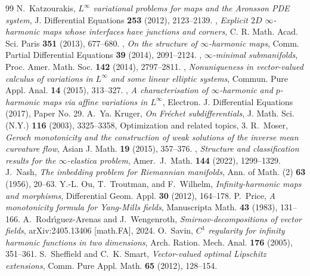 \documentclass[10pt,a4paper]{amsart}
\begin{document}
\begin{thebibliography}{99}
 N.~Katzourakis, \emph{{$L^\infty$} variational problems for maps and the {A}ronsson {PDE} system}, J. Differential Equations \textbf{253} (2012), 2123--2139.
 \bysame, \emph{Explicit {$2D$} {$\infty$}-harmonic maps whose interfaces have junctions and corners}, C. R. Math. Acad. Sci. Paris \textbf{351} (2013), 677--680.
 \bysame, \emph{On the structure of {$\infty$}-harmonic maps}, Comm. Partial Differential Equations \textbf{39} (2014), 2091--2124.
 \bysame, \emph{{$\infty$}-minimal submanifolds}, Proc. Amer. Math. Soc. \textbf{142} (2014), 2797--2811.
 \bysame, \emph{Nonuniqueness in vector-valued calculus of variations in {$L^\infty$} and some linear elliptic systems}, Commun. Pure Appl. Anal. \textbf{14} (2015), 313--327.
 \bysame, \emph{A characterisation of {$\infty$}-harmonic and {$p$}-harmonic maps via affine variations in {$L^\infty$}}, Electron. J. Differential Equations (2017), Paper No. 29.
 A.~Ya. Kruger, \emph{On {F}r\'echet subdifferentials}, J. Math. Sci. (N.Y.) \textbf{116} (2003), 3325--3358, Optimization and related topics, 3.
 R.~Moser, \emph{Geroch monotonicity and the construction of weak solutions of the inverse mean curvature flow}, Asian J. Math. \textbf{19} (2015), 357--376.
 \bysame, \emph{Structure and classification results for the $\infty$-elastica problem}, Amer.\ J.\ Math. \textbf{144} (2022), 1299--1329.
 J.~Nash, \emph{The imbedding problem for {R}iemannian manifolds}, Ann. of Math. (2) \textbf{63} (1956), 20--63.
 Y.-L. Ou, T.~Troutman, and F.~Wilhelm, \emph{Infinity-harmonic maps and morphisms}, Differential Geom. Appl. \textbf{30} (2012), 164--178.
 P.~Price, \emph{A monotonicity formula for {Y}ang-{M}ills fields}, Manuscripta Math. \textbf{43} (1983), 131--166.
 A.~Rodr{\'\i}guez-Arenas and J.~Wengenroth, \emph{Smirnov-decompositions of vector fields}, arXiv:2405.13406 [math.FA], 2024.
 O.~Savin, \emph{{$C^1$} regularity for infinity harmonic functions in two dimensions}, Arch. Ration. Mech. Anal. \textbf{176} (2005), 351--361.
 S.~Sheffield and C.~K. Smart, \emph{Vector-valued optimal {L}ipschitz extensions}, Comm. Pure Appl. Math. \textbf{65} (2012), 128--154.

\end{thebibliography}
\end{document}
